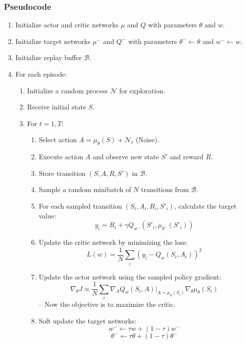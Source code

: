 \documentclass[12pt]{article}
\begin{document}
\subsubsection{Pseudocode}
\begin{enumerate}
    \item Initialize actor and critic networks $\mu$ and $Q$ with parameters $\theta$ and $w$.
    \item Initialize target networks $\mu^-$ and $Q^-$ with parameters $\theta^- \leftarrow \theta$ and $w^- \leftarrow w$.
    \item Initialize replay buffer $\mathcal{B}$.
    \item For each episode:
    \begin{enumerate}
        \item Initialize a random process $\mathcal{N}$ for exploration.
        \item Receive initial state $S$.
        \item For $t=1, T$:
        \begin{enumerate}
            \item Select action $A = \mu_\theta(S) + \mathcal{N}_t$ (Noise).
            \item Execute action $A$ and observe new state $S'$ and reward $R$.
            \item Store transition $(S, A, R, S')$ in $\mathcal{B}$.
            \item Sample a random minibatch of $N$ transitions from $\mathcal{B}$.
            \item For each sampled transition $(S_i, A_i, R_i, S'_i)$, calculate the target value:
            \[
                y_i = R_i + \gamma Q_{w^-}(S'_i, \mu_{\theta^-}(S'_i))
            \]
            \item Update the critic network by minimizing the loss:
            \[
                L(w) = \frac{1}{N} \sum_i (y_i - Q_w(S_i, A_i))^2
            \]
            \item Update the actor network using the sampled policy gradient:
            \[
                \nabla_{\theta} J \approx \frac{1}{N} \sum_i \nabla_A Q_w(S_i, A)|_{A=\mu_\theta(S_i)} \nabla_\theta \mu_\theta(S_i)
            \]  -- Now the objective is to maximize the critic. 
            \item Soft update the target networks:
            \[
                w^- \leftarrow \tau w + (1-\tau)w^-
            \]
            \[
                \theta^- \leftarrow \tau \theta + (1-\tau)\theta^-
            \]
        \end{enumerate}
    \end{enumerate}
\end{enumerate}
\end{document}
